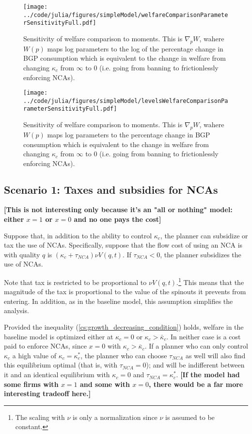 \documentclass[11pt,english]{article}
\theoremstyle{remark}
\begin{document}
\begin{figure}[]
	\texttt{[image: ../code/julia/figures/simpleModel/welfareComparisonParameterSensitivityFull.pdf]}
	\caption{Sensitivity of welfare comparison to moments. This is $\nabla_p W$, wahere $W(p)$ maps log parameters to the log of the percentage change in BGP consumption which is equivalent to the change in welfare from changing $\kappa_c$ from $\infty$ to $0$ (i.e. going from banning to frictionlessly enforcing NCAs).}
	\label{welfareComparisonParameterSensitivityFull}
\end{figure}

\begin{figure}[]
	\texttt{[image: ../code/julia/figures/simpleModel/levelsWelfareComparisonParameterSensitivityFull.pdf]}
	\caption{Sensitivity of welfare comparison to moments. This is $\nabla_p W$, wahere $W(p)$ maps log parameters to the percentage change in BGP consumption which is equivalent to the change in welfare from changing $\kappa_c$ from $\infty$ to $0$ (i.e. going from banning to frictionlessly enforcing NCAs).}
	\label{levelsWelfareComparisonParameterSensitivityFull}
\end{figure}

\subsection{Scenario 1: Taxes and subsidies for NCAs}

\textbf{[This is not interesting only because it's an "all or nothing" model: either $x = 1$ or $x = 0$ and no one pays the cost]}

Suppose that, in addition to the ability to control $\kappa_c$, the planner can subsidize or tax the use of NCAs. Specifically, suppose that the flow cost of using an NCA is with quality $q$ is $(\kappa_c + \tau_{NCA})\nu  V(q,t)$. If $\tau_{NCA} < 0$, the planner subsidizes the use of NCAs.

Note that tax is restricted to be proportional to $\nu V(q,t)$.\footnote{The scaling with $\nu$ is only a normalization since $\nu$ is assumed to be constant.} This means that the magnitude of the tax is proportional to the value of the spinouts it prevents from entering. In addition, as in the baseline model, this assumption simplifies the analysis.

Provided the inequality (\ref{cs:growth_decreasing_condition}) holds, welfare in the baseline model is optimized either at $\kappa_c = 0$ or $\kappa_c > \bar{\kappa}_c$. In neither case is a cost paid to enforce NCAs, since $x = 0$ with $\kappa_c > \bar{\kappa}_c$. If a planner who can only control $\kappa_c$ a high value of $\kappa_c = \kappa_c^*$, the planner who can choose $\tau_{NCA}$ as well will also find this equilibrium optimal (that is, with $\tau_{NCA} = 0$); and will be indifferent between it and an identical equilibrium with $\kappa_c = 0$ and $\tau_{NCA} = \kappa_c^*$. \textbf{[If the model had some firms with $x = 1$ and some with $x = 0$, there would be a far more interesting tradeoff here.]} 
\end{document}
